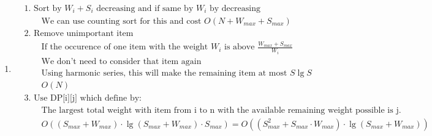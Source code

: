 \documentclass{article}
\begin{document}
	\begin{enumerate}
		\item {
			\begin{align*}
				&\text{1. Sort by $W_i + S_i$ decreasing and if same by $W_i$ by decreasing}\\
				&\qquad\text{We can use counting sort for this and cost $O(N + W_{max} + S_{max})$}\\
				&\text{2. Remove unimportant item}\\
				&\qquad\text{If the occurence of one item with the weight $W_i$ is above $\frac{W_{max} + S_{max}}{W_i}$}\\
				&\qquad\text{We don't need to consider that item again}\\
				&\qquad\text{Using harmonic series, this will make the remaining item at most $S \lg S$}\\
				&\qquad O(N)\\
				&\text{3. Use DP[i][j] which define by:}\\
				&\qquad\text{The largest total weight with item from i to n with the available remaining weight possible is j.}\\
				&\qquad O((S_{max} + W_{max})\cdot\lg(S_{max} + W_{max}) \cdot S_{max}) = O((S_{max}^2 + S_{max}\cdot W_{max})\cdot\lg (S_{max} + W_{max}))\\

\end{align*}}
\end{enumerate}
\end{document}
